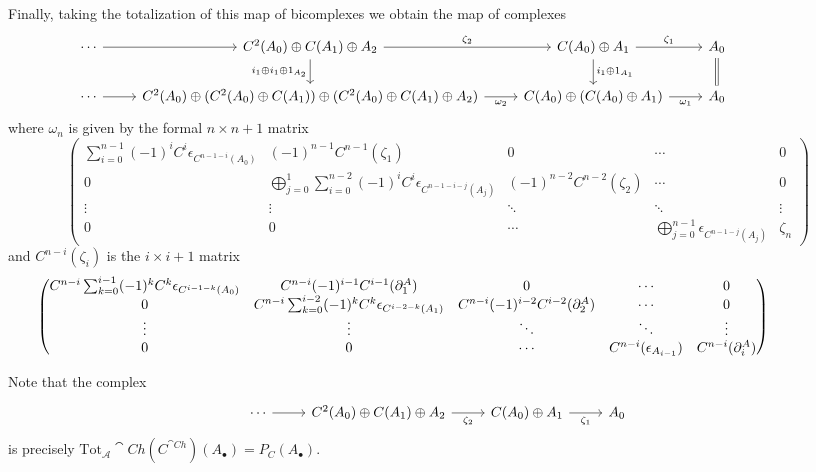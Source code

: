 Finally, taking the totalization of this map of bicomplexes we obtain the map of complexes
\[\hspace{-50pt}\begin{tikzcd}
	\cdots & {C^2(A_0)\oplus C(A_1)\oplus A_2} & {C(A_0)\oplus A_1} & {A_0} \\
	\cdots & {C^2(A_0)\oplus (C^2(A_0)\oplus C(A_1))\oplus (C^2(A_0)\oplus C(A_1)\oplus A_2)} & {C(A_0)\oplus (C(A_0)\oplus A_1)} & {A_0}
	\arrow[from=1-1, to=1-2]
	\arrow["{\zeta_2}", from=1-2, to=1-3]
	\arrow["{\zeta_1}", from=1-3, to=1-4]
	\arrow[Rightarrow, no head, from=1-4, to=2-4]
	\arrow["{i_1\oplus 1_{A_1}}", from=1-3, to=2-3]
	\arrow["{\omega_1}"', from=2-3, to=2-4]
	\arrow["{\omega_2}"', from=2-2, to=2-3]
	\arrow[from=2-1, to=2-2]
	\arrow["{i_1\oplus i_1\oplus 1_{A_2}}"', from=1-2, to=2-2]
\end{tikzcd}\]
where $\omega_n$ is given by the formal $n\times n+1$ matrix
\begin{equation*}
    \begin{pmatrix}
        \sum_{i=0}^{n-1}(-1)^iC^i\epsilon_{C^{n-1-i}(A_0)} & (-1)^{n-1}C^{n-1}(\zeta_1) & 0 & \cdots & 0 \\
        0 & \bigoplus_{j=0}^1\sum_{i=0}^{n-2}(-1)^iC^i\epsilon_{C^{n-1-i-j}(A_j)} & (-1)^{n-2}C^{n-2}(\zeta_2) & \cdots & 0 \\
        \vdots & \vdots & \ddots & \ddots & \vdots \\
        0 & 0 & \cdots & \bigoplus_{j=0}^{n-1}\epsilon_{C^{n-1-j}(A_j)} & \zeta_{n}
    \end{pmatrix}
\end{equation*}
and $C^{n-i}(\zeta_i)$ is the $i\times i+1$ matrix 
\begin{equation*}\hspace{-50pt}
    \begin{pmatrix}
        C^{n-i}\sum_{k=0}^{i-1}(-1)^kC^k\epsilon_{C^{i-1-k}(A_0)} & C^{n-i}(-1)^{i-1}C^{i-1}(\partial_1^A) & 0 & \cdots & 0 \\
        0 & C^{n-i}\sum_{k=0}^{i-2}(-1)^kC^k\epsilon_{C^{i-2-k}(A_1)} & C^{n-i}(-1)^{i-2}C^{i-2}(\partial_2^A) & \cdots & 0 \\
        \vdots & \vdots & \ddots & \ddots & \vdots \\
        0 & 0 & \cdots & C^{n-i}(\epsilon_{A_{i-1}}) & C^{n-i}(\partial_{i}^A)
    \end{pmatrix}
\end{equation*}

Note that the complex 
\[\begin{tikzcd}
	\cdots & {C^2(A_0)\oplus C(A_1)\oplus A_2} & {C(A_0)\oplus A_1} & {A_0}
	\arrow["{\zeta_2}"', from=1-2, to=1-3]
	\arrow["{\zeta_1}"', from=1-3, to=1-4]
	\arrow[from=1-1, to=1-2]
\end{tikzcd}\]
is precisely $\text{Tot}_\mathcal{A}\cat{Ch}(C^{\cat{Ch}})(A_\bullet) = P_C(A_\bullet)$.

